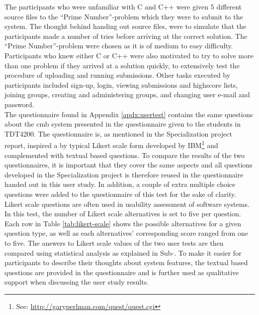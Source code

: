 The participants who were unfamiliar with C and C++ were given 5 different source files to the ``Prime Number''-problem which they were to submit to the system. The thought behind handing out source files, were to simulate that the participants made a number of tries before arriving at the correct solution. The ``Prime Number''-problem were chosen as it is of medium to easy difficulty. Participants who knew either C or C++ were also motivated to try to solve more than one problem if they arrived at a solution quickly, to extensively test the procedure of uploading and running submissions. Other tasks executed by participants included sign-up, login, viewing submissions and highscore lists, joining groups, creating and administering groups, and changing user e-mail and password. \\

The questionnaire found in Appendix \ref{apdx:usertest} contains the same questions about the \gls{cmb} system presented in the questionnaire given to the students in TDT4200. The questionnaire is, as mentioned in the Specialization project report, inspired a by typical Likert scale form developed by IBM\footnote{See: \url{http://garyperlman.com/quest/quest.cgi}} and complemented with textual based questions. To compare the results of the two questionnaires, it is important that they cover the same aspects and all questions developed in the Specialization project is therefore reused in the questionnaire handed out in this user study. In addition, a couple of extra multiple choice questions were added to the questionnaire of this test for the sake of clarity. \\

Likert scale questions are often used in usability assessment of software systems. In this test, the number of Likert scale alternatives is set to five per question. Each row in Table \ref{tab:likert-scale} shows the possible alternatives for a given question type, as well as each alternatives' corresponding score ranged from one to five. The answers to Likert scale values of the two user tests are then compared using statistical analysis as explained in Sub-. To make it easier for participants to describe their thoughts about system features, the textual based questions are provided in the questionnaire and is further used as qualitative support when discussing the user study results.

